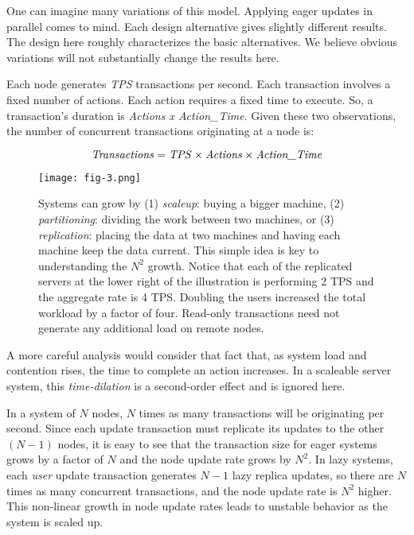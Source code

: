 \documentclass[a4paper,12pt,twoside,openright]{article}
\begin{document}
One can imagine many variations of this model. Applying eager updates in
parallel comes to mind. Each design alternative gives slightly different
results. The design here roughly characterizes the basic alternatives.
We believe obvious variations will not substantially change the results
here.

Each node generates \emph{TPS} transactions per second. Each transaction
involves a fixed number of actions. Each action requires a fixed time to
execute. So, a transaction's duration is \emph{Actions x Action\_Time}.
Given these two observations, the number of concurrent transactions
originating at a node is:

\begin{equation}
\text{\emph{Transactions}} = \text{\emph{TPS}} \times \text{\emph{Actions}} \times \text{\emph{Action\_Time}}
\end{equation}

\begin{figure}
  \centering
  \texttt{[image: fig-3.png]}
  \caption{Systems can grow by (1) \emph{scaleup}: buying a bigger
machine, (2) \emph{partitioning}: dividing the work between two
machines, or (3) \emph{replication}: placing the data at two machines
and having each machine keep the data current. This simple idea is key
to understanding the \(N^2\) growth. Notice that
each of the replicated servers at the lower right of the illustration is
performing 2 TPS and the aggregate rate is 4 TPS. Doubling the users
increased the total workload by a factor of four. Read-only transactions
need not generate any additional load on remote nodes.}
\end{figure}

A more careful analysis would consider that fact that, as system load
and contention rises, the time to complete an action increases. In a
scaleable server system, this \emph{time-dilation} is a second-order
effect and is ignored here.

In a system of \(N\) nodes, \(N\) times as many transactions will
be originating per second. Since each update transaction must replicate
its updates to the other \((N - 1)\) nodes, it is easy to see that the
transaction size for eager systems grows by a factor of \(N\) and the
node update rate grows by \(N^2\). In lazy systems,
each \emph{user} update transaction generates \(N - 1\) lazy replica
updates, so there are \(N\) times as many concurrent transactions,
and the node update rate is \(N^2\) higher. This
non-linear growth in node update rates leads to unstable behavior as the
system is scaled up.
\end{document}
